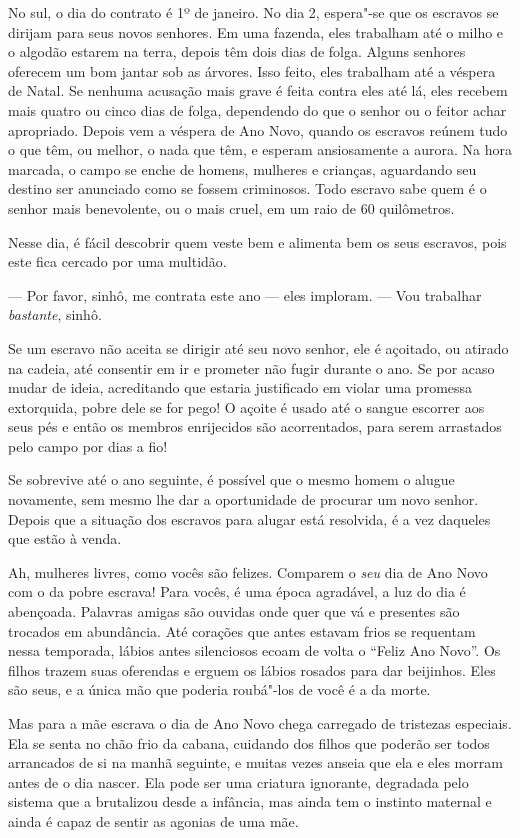 No sul, o dia do contrato é 1º de
janeiro. No dia 2, espera"-se que os escravos se dirijam para seus novos
senhores. Em uma fazenda, eles trabalham até o milho e o algodão estarem
na terra, depois têm dois dias de folga. Alguns senhores oferecem um bom
jantar sob as árvores. Isso feito, eles trabalham até a véspera de
Natal. Se nenhuma acusação mais grave é feita contra eles até lá, eles
recebem mais quatro ou cinco dias de folga, dependendo do que o senhor
ou o feitor achar apropriado. Depois vem a véspera de Ano Novo, quando
os escravos reúnem tudo o que têm, ou melhor, o nada que têm, e esperam
ansiosamente a aurora. Na hora marcada, o campo se enche de homens,
mulheres e crianças, aguardando seu destino ser anunciado como se fossem
criminosos. Todo escravo sabe quem é o senhor mais benevolente, ou o
mais cruel, em um raio de 60 quilômetros.

Nesse dia, é fácil descobrir quem veste
bem e alimenta bem os seus escravos, pois este fica cercado por uma
multidão.

--- Por favor, sinhô, me contrata este ano --- eles imploram. --- Vou
trabalhar \emph{bastante}, sinhô.

Se um escravo não aceita se dirigir até
seu novo senhor, ele é açoitado, ou atirado na cadeia, até consentir em
ir e prometer não fugir durante o ano. Se por acaso mudar de ideia,
acreditando que estaria justificado em violar uma promessa extorquida,
pobre dele se for pego! O açoite é usado até o sangue escorrer aos seus
pés e então os membros enrijecidos são acorrentados, para serem
arrastados pelo campo por dias a fio!

Se sobrevive até o ano seguinte, é
possível que o mesmo homem o alugue novamente, sem mesmo lhe dar a
oportunidade de procurar um novo senhor. Depois que a situação dos
escravos para alugar está resolvida, é a vez daqueles que estão à venda.

Ah, mulheres livres, como vocês são
felizes. Comparem o \emph{seu} dia de Ano Novo com o da pobre escrava!
Para vocês, é uma época agradável, a luz do dia é abençoada. Palavras
amigas são ouvidas onde quer que vá e presentes são trocados em
abundância. Até corações que antes estavam frios se requentam nessa
temporada, lábios antes silenciosos ecoam de volta o ``Feliz Ano Novo''.
Os filhos trazem suas oferendas e erguem os lábios rosados para dar
beijinhos. Eles são seus, e a única mão que poderia roubá"-los de você é
a da morte.

Mas para a mãe escrava o dia de Ano
Novo chega carregado de tristezas especiais. Ela se senta no chão frio
da cabana, cuidando dos filhos que poderão ser todos arrancados de si na
manhã seguinte, e muitas vezes anseia que ela e eles morram antes de o
dia nascer. Ela pode ser uma criatura ignorante, degradada pelo sistema
que a brutalizou desde a infância, mas ainda tem o instinto maternal e
ainda é capaz de sentir as agonias de uma mãe.

